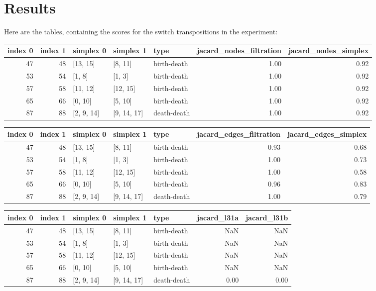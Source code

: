 \documentclass{article}
\begin{document}
\section{Results}

\par Here are the tables, containing the scores for the switch transpositions in the experiment:

\begin{center}
\begin{tabular}{rrlllrr}
\toprule
index 0 & index 1 & simplex 0 & simplex 1 & type & jacard\_nodes\_filtration & jacard\_nodes\_simplex \\
\midrule
47 & 48 & [13, 15] & [8, 11] & birth-death & 1.00 & 0.92 \\
53 & 54 & [1, 8] & [1, 3] & birth-death & 1.00 & 0.92 \\
57 & 58 & [11, 12] & [12, 15] & birth-death & 1.00 & 0.92 \\
65 & 66 & [0, 10] & [5, 10] & birth-death & 1.00 & 0.92 \\
87 & 88 & [2, 9, 14] & [9, 14, 17] & death-death & 1.00 & 0.92 \\
\bottomrule
\end{tabular}
\end{center}

\begin{center}
\begin{tabular}{rrlllrr}
\toprule
index 0 & index 1 & simplex 0 & simplex 1 & type & jacard\_edges\_filtration & jacard\_edges\_simplex \\
\midrule
47 & 48 & [13, 15] & [8, 11] & birth-death & 0.93 & 0.68 \\
53 & 54 & [1, 8] & [1, 3] & birth-death & 1.00 & 0.73 \\
57 & 58 & [11, 12] & [12, 15] & birth-death & 1.00 & 0.58 \\
65 & 66 & [0, 10] & [5, 10] & birth-death & 0.96 & 0.83 \\
87 & 88 & [2, 9, 14] & [9, 14, 17] & death-death & 1.00 & 0.79 \\
\bottomrule
\end{tabular}
\end{center}

\begin{center}
\begin{tabular}{rrlllrr}
\toprule
index 0 & index 1 & simplex 0 & simplex 1 & type & jacard\_l31a & jacard\_l31b \\
\midrule
47 & 48 & [13, 15] & [8, 11] & birth-death & NaN & NaN \\
53 & 54 & [1, 8] & [1, 3] & birth-death & NaN & NaN \\
57 & 58 & [11, 12] & [12, 15] & birth-death & NaN & NaN \\
65 & 66 & [0, 10] & [5, 10] & birth-death & NaN & NaN \\
87 & 88 & [2, 9, 14] & [9, 14, 17] & death-death & 0.00 & 0.00 \\
\bottomrule
\end{tabular}
\end{center}
\end{document}
